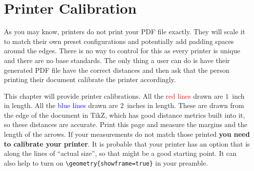 \chapter{Printer Calibration}\label{chapter:printer_calibration}

As you may know, printers do not print your PDF file exactly.
They will scale it to match their own preset configurations and potentially add padding spaces around the edges.
There is no way to control for this as every printer is unique and there are no base standards.
The only thing a user can do is have their generated PDF file have the correct distances and then ask that the person printing their document calibrate the printer accordingly.

\printercalibration{}

\vspace{2.5in}
This chapter will provide printer calibrations.
All the \textcolor{red}{red lines} drawn are $1$~inch in length.
All the \textcolor{blue}{blue lines} drawn are $2$~inches in length.
These are drawn from the edge of the document in TikZ, which has good distance metrics built into it, so these distances are accurate.
Print this page and measure the margins and the length of the arrows.
If your measurements do not match those printed \textbf{you need to calibrate your printer}.
It is probable that your printer has an option that is along the lines of ``actual size'', so that might be a good starting point.
It can also help to turn on \verb|\geometry{showframe=true}| in your preamble.
